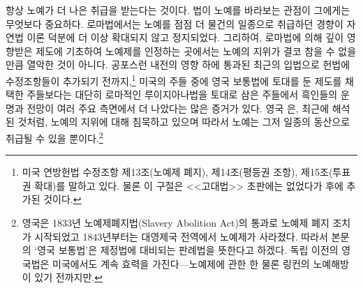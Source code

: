 항상 노예가 더 나은 취급을 받는다는 것이다.
법이 노예를 바라보는 관점이 그에게는 무엇보다 중요하다.
로마법에서는
노예를 점점 더 물건의 일종으로 취급하던 경향이
자연법 이론 덕분에
더 이상 확대되지 않고 정지되었다.
그리하여,
로마법에 의해 깊이 영향받은 제도에 기초하여 노예제를 인정하는 곳에서는
노예의 지위가 결코 참을 수 없을 만큼 열악한 것이 아니다.
공포스런 내전의 영향 하에 통과된 최근의 입법으로
헌법에 수정조항들이 추가되기 전까지,\footnote{%
  미국 연방헌법 수정조항 제13조(노예제 폐지), 제14조(평등권 조항),
  제15조(투표권 확대)를 말하고 있다.
  물론 이 구절은 <<고대법>> 초판에는 없었다가 후에 추가된 것이다.}
미국의 주들 중에
영국 보통법에 토대를 둔 제도를 채택한 주들보다는
대단히 로마적인 루이지아나법을 토대로 삼은 주들에서
흑인들의 운명과 전망이 여러 주요 측면에서 더 나았다는
많은 증거가 있다.
영국 은, 최근에 해석된 것처럼,
노예의 지위에 대해 침묵하고 있으며
따라서 노예는 그저 일종의 동산으로 취급될 수 있을 뿐이다.\footnote{%
  영국은 1833년 노예제폐지법(Slavery Abolition Act)의 통과로
  노예제 폐지 조치가 시작되었고
  1843년부터는 대영제국 전역에서 노예제가 사라졌다.
  따라서 본문의 `영국 보통법'은 제정법에 대비되는 판례법을 뜻한다고 하겠다.
  독립 이전의 영국법은 미국에서도 계속 효력을 가진다---노예제에 관한 한
  물론 링컨의 노예해방이 있기 전까지만. }

